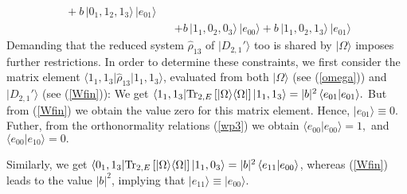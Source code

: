 \documentclass[pra,preprint,a4paper,superscriptaddress]{revtex4}
\begin{document}
{\begin{eqnarray}
 \ +b\,  \vert 0_1,1_2,1_3\rangle\,\vert e_{01}\rangle\nonumber \\ 
 &&+ b\,  \vert 1_1,0_2,0_3\rangle\,\vert e_{00}\rangle  
+ b\,  \vert 1_1,0_2,1_3\rangle\,\vert e_{01}\rangle
\end{eqnarray} 
Demanding that the reduced system $\hat{\rho}_{13}$ of $\vert D_{2,1}'\rangle$  too is shared by $\vert 
\Omega\rangle$ imposes further restrictions. 
In order to determine these constraints, 
we first consider the matrix element $\langle 1_1,1_3\vert\hat{\rho}_{13}\vert 1_1,1_3\rangle$, evaluated from both  
$\vert\Omega\rangle$ (see (\ref{omega})) and $\vert D_{2,1}'\rangle$  (see (\ref{Wfin})): 
We get
 $\langle 1_1,1_3\vert{\rm Tr}_{2,E}\, [\vert\Omega\rangle\langle\Omega\vert]\, \vert 1_1,1_3\rangle=\vert %
b\vert ^2\, \langle e_{01}\vert e_{01}\rangle.$  
But  from (\ref{Wfin}) we obtain  the value zero for this matrix element.  
Hence, $\vert e_{01}\rangle\equiv 0.$ 
Futher, from the orthonormality relations (\ref{wp3}) 
 we obtain $\langle e_{00}\vert e_{00}\rangle=1,$ 
 and $\langle e_{00}\vert e_{10}\rangle=0.$ 

Similarly, we get $\langle 0_1,1_3\vert{\rm Tr}_{2,E}\, [\vert\Omega\rangle\langle\Omega\vert]\, \vert %
1_1,0_3\rangle=\vert b\vert^2\, \langle e_{11}\vert e_{00}\rangle$,  
whereas  (\ref{Wfin}) leads to the value $\vert b\vert^2$, implying that $\vert e_{11}\rangle\equiv \vert %
e_{00}\rangle.$ 
 
}
\end{document}
